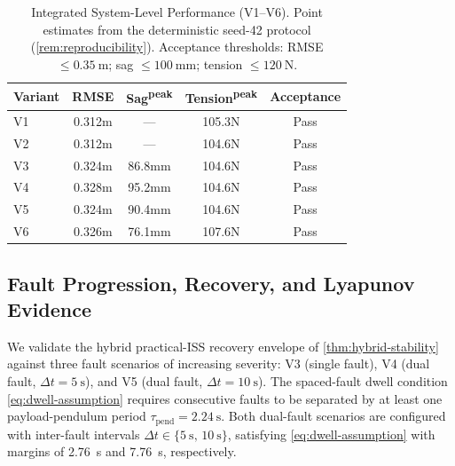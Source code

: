 \begin{table}[htbp]
  \caption{%
    Integrated System-Level Performance (V1--V6). Point estimates from the deterministic seed-42 protocol (\cref{rem:reproducibility}). Acceptance thresholds: RMSE $\le \SI{0.35}{\metre}$; sag $\le \SI{100}{\milli\metre}$; tension $\le \SI{120}{\newton}$.%
  }
  \label{tab:performance-ci}
  \centering
  \small
  \renewcommand{\arraystretch}{1.05}
  \begin{tabular}{lcccc}
    \toprule
    Variant & RMSE & Sag\textsuperscript{peak}
            & Tension\textsuperscript{peak} & Acceptance \\
    \midrule
    V1 & 0.312m & ---  & 105.3N & Pass \\
    V2 & 0.312m & ---  & 104.6N & Pass \\
    V3 & 0.324m & 86.8mm & 104.6N & Pass \\
    V4 & 0.328m & 95.2mm & 104.6N & Pass \\
    V5 & 0.324m & 90.4mm & 104.6N & Pass \\
    V6 & 0.326m & 76.1mm & 107.6N & Pass \\
    \bottomrule
  \end{tabular}
\end{table}

\subsection{Fault Progression, Recovery, and Lyapunov Evidence}
\label{sec:VI-C}

We validate the hybrid practical-ISS recovery envelope of \cref{thm:hybrid-stability} against three fault scenarios of increasing severity: V3 (single fault), V4 (dual fault, $\Delta t = \SI{5}{\second}$), and V5 (dual fault, $\Delta t = \SI{10}{\second}$). The spaced-fault dwell condition \eqref{eq:dwell-assumption} requires consecutive faults to be separated by at least one payload-pendulum period $\tau_{\mathrm{pend}} = \SI{2.24}{\second}$. Both dual-fault scenarios are configured with inter-fault intervals $\Delta t \in \{\SI{5}{\second},\,\SI{10}{\second}\}$, satisfying \eqref{eq:dwell-assumption} with margins of \SI{2.76}{\second} and \SI{7.76}{\second}, respectively.


